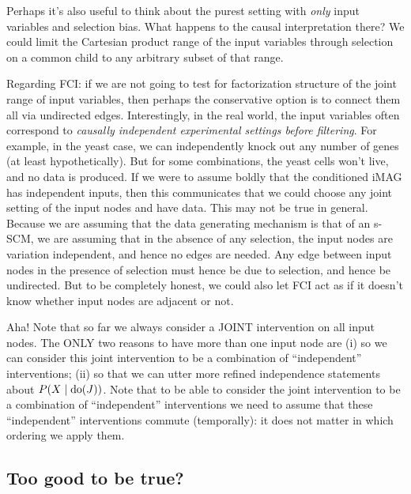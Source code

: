 {Perhaps it's also useful to think about the purest setting with \emph{only} input variables and selection bias.
What happens to the causal interpretation there? We could limit the Cartesian product range of the input variables
through selection on a common child to any arbitrary subset of that range. 

Regarding FCI: if we are not going to test for factorization structure of the joint range of input variables, then
perhaps the conservative option is to connect them all via undirected edges. Interestingly, in the real world, the
input variables often correspond to \emph{causally independent experimental settings before filtering}. For example,
in the yeast case, we can independently knock out any number of genes (at least hypothetically). But for some 
combinations, the yeast cells won't live, and no data is produced. If we were to assume boldly that the conditioned
iMAG has independent inputs, then this communicates that we could choose any joint setting of the input nodes and
have data. This may not be true in general. Because we are assuming that the data generating mechanism is that of 
an s-SCM, we are assuming that in the absence of any selection, the input nodes are variation independent, and hence
no edges are needed. Any edge between input nodes in the presence of selection must hence be due to selection, and
hence be undirected. But to be completely honest, we could also let FCI act as if it doesn't know whether input
nodes are adjacent or not.

Aha! Note that so far we always consider a JOINT intervention on all input nodes. The ONLY two reasons to have more
than one input node are (i) so we can consider this joint intervention to be a combination of ``independent'' 
interventions; (ii) so that we can utter more refined independence statements about $P(X \mid \operatorname{do}(J))$.
Note that to be able to consider the joint intervention to be a combination of ``independent'' interventions 
we need to assume that these ``independent'' interventions commute (temporally): it does not matter in which
ordering we apply them.
}

\subsection{Too good to be true?}

